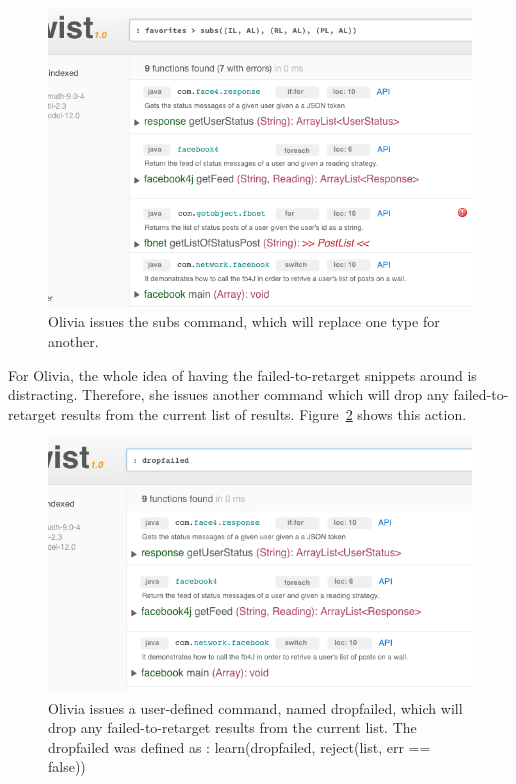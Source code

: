\begin{figure}[!ht]
    \centering
    \includegraphics[width=\textwidth]{images/twistretarget}
    \caption{Olivia issues the subs command, which will replace one type for 
	 another.}
    \label{fig:twistretarget}
\end{figure} 

For Olivia, the whole idea of having the failed-to-retarget snippets around is distracting. Therefore, she issues another command which will drop any failed-to-retarget results from the current list of results. Figure~\ref{fig:twistclean} shows this action. 

\begin{figure}[!ht]
    \centering
    \includegraphics[width=\textwidth]{images/twistclean}
    \caption{Olivia issues a user-defined command, named dropfailed, which will drop 
	 any failed-to-retarget results from the current list. The dropfailed was defined as : 
	 learn(dropfailed, reject(list, err == false))}
    \label{fig:twistclean}
\end{figure}   

